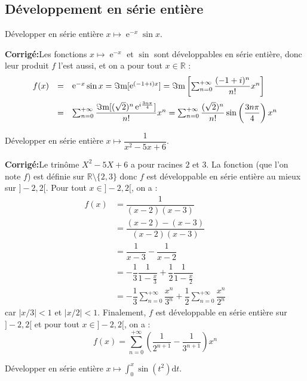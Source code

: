 \documentclass[a4paper,twoside,french,11pt]{VcCours}
\DeclareMathOperator{\e}{e}
\newcommand{\corr}{\textbf{Corrigé:}}
\begin{document}
\subsection{Développement en série entière}


\begin{Exercice}{} Développer en série entière $x \mapsto \e^{-x}\sin x$.
\end{Exercice}

\corr Les fonctions $x\mapsto\e^{-x}$ et $\sin$ sont développables en série entière, donc leur produit $f$ l'est aussi, et on a pour tout $x\in\mathbb{R}$ : 
\[
\begin{array}{rcl}
f(x) &= & \e^{-x}\sin x=\Im\mathrm{m}[\e^{(-1+i)x}]=\Im\mathrm{m}\left[\sum_{n=0}^{+\infty}\dfrac{(-1+i)^n}{n!}x^n\right]\\
\vspace*{-0.2cm}\\
& = & \sum_{n=0}^{+\infty}\dfrac{\Im\mathrm{m}[(\sqrt{2})^n\e^{i\frac{3n\pi}{4}}]}{n!}x^n=\sum_{n=0}^{+\infty}\dfrac{(\sqrt{2})^n}{n!}\sin\left(\dfrac{3n\pi}{4}\right)x^n
\end{array}
\]

\begin{Exercice}{} Développer en série entière $x \mapsto \dfrac{1}{x^2-5x+6}$.
\end{Exercice}

\corr Le trinôme $X^2-5X+6$ a pour racines $2$ et $3$. La fonction (que l'on note $f$) est définie sur $\mathbb{R} \setminus \lbrace 2,3 \rbrace$ donc $f$ est développable en série entière au mieux sur $]-2,2[$. Pour tout $x \in ]-2,2[$, on a :
\begin{align*}
f(x) & = \dfrac{1}{(x-2)(x-3)}\\
&  = \dfrac{(x-2)-(x-3)}{(x-2)(x-3)}  \\
& = \dfrac{1}{x-3} - \dfrac{1}{x-2} \\
& = -\dfrac{1}{3}\dfrac{1}{1-\frac{x}{3}}+\dfrac{1}{2}\dfrac{1}{1-\frac{x}{2}} \\
& =-\dfrac{1}{3}\sum_{n=0}^{+\infty}\dfrac{x^n}{3^n}+\dfrac{1}{2}\sum_{n=0}^{+\infty}\dfrac{x^n}{2^n}
\end{align*} 
car $\vert x/3 \vert <1$ et $\vert x/2 \vert <1$. Finalement, $f$ est développable en série entière sur $]-2,2[$ et pour tout $x \in ]-2,2[$, on a :
$$ f(x) = \sum_{n=0}^{+\infty}\left(  \dfrac{1}{2^{n+1}}-\dfrac{1}{3^{n+1}}\right)x^n$$

\begin{Exercice}{} Développer en série entière $x \mapsto \int_0^x\sin(t^2)\mathrm{d}t$.
\end{Exercice}
\end{document}
